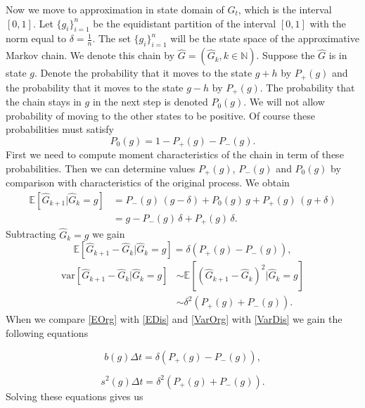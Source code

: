 Now we move to approximation in state domain of $G_t$, which is the interval $[0,1]$. Let $\{g_i\}_{i=1}^{n}$ be the equidistant partition of the interval $[0,1]$ with the norm equal to $\delta=\tfrac{1}{n}$. The set $\{g_i\}_{i=1}^{n}$ will be the state space of the approximative Markov chain. We denote this chain by $\widehat{G}=(\widehat{G}_k,k\in\mathbb{N})$. Suppose the $\widehat{G}$ is in state $g$. Denote the probability that it moves to the state $g+h$ by  $P_{+}(g)$ and the probability that it moves to the state $g-h$ by  $P_{+}(g)$. The probability that the chain stays in $g$ in the next step is denoted $P_{0}(g)$. We will not allow probability of moving to the other states to be positive. %
Of course these probabilities must satisfy
\[P_0(g)=1-P_{+}(g)-P_{-}(g).\]
First we need to compute moment characteristics of the chain in term of these probabilities. Then we can determine values $P_{+}(g)$, $P_{-}(g)$ and $P_{0}(g)$ by comparison with characteristics of the original process. We obtain
\begin{align*}
\mathbb{E}[\widehat{G}_{k+1}|\widehat{G}_{k}=g]&=P_{-}(g)\,(g-\delta)+P_{0}(g)\,g+P_{+}(g)\,(g+\delta)\\
&=g-P_{-}(g)\,\delta+P_{+}(g)\,\delta.
\end{align*}
Subtracting $\widehat{G}_{k}=g$ we gain
\begin{equation}
\label{EDis}
\mathbb{E}[\widehat{G}_{k+1}-\widehat{G}_{k}|\widehat{G}_{k}=g]=\delta(P_{+}(g)-P_{-}(g)),
\end{equation}
\begin{equation}
\label{VarDis}
\begin{split}
\text{var}[\widehat{G}_{k+1}-\widehat{G}_{k}|\widehat{G}_{k}=g]&\sim\mathbb{E}[(\widehat{G}_{k+1}-\widehat{G}_{k})^2|\widehat{G}_{k}=g]\\
&\sim \delta^2(P_{+}(g)+P_{-}(g)).
\end{split}
\end{equation}
When we compare \eqref{EOrg} with \eqref{EDis} and \eqref{VarOrg} with \eqref{VarDis} we gain the following equations

\begin{equation*}
b(g)\Delta t= \delta(P_{+}(g)-P_{-}(g)),
\end{equation*}

\begin{equation*}
s^2(g)\Delta t= \delta^2(P_{+}(g)+P_{-}(g)).
\end{equation*}
Solving these equations gives us

